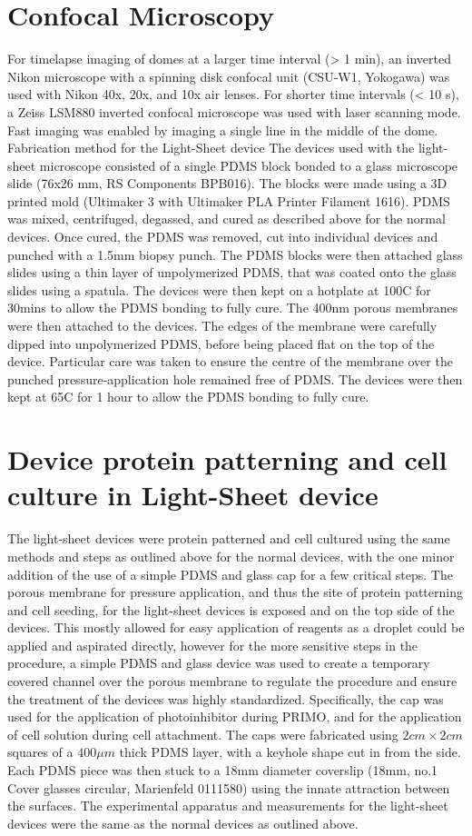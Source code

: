 \section{Confocal Microscopy}
For timelapse imaging of domes at a larger time interval (> 1 min), an inverted Nikon microscope with a spinning disk confocal unit (CSU-W1, Yokogawa) was used with Nikon 40x, 20x, and 10x air lenses. For shorter time intervals (< 10 s), a Zeiss LSM880 inverted confocal microscope was used with laser scanning mode. Fast imaging was enabled by imaging a single line in the middle of the dome.
Fabrication method for the Light-Sheet device
The devices used with the light-sheet microscope consisted of a single PDMS block bonded to a glass microscope slide (76x26 mm, RS Components BPB016). The blocks were made using a 3D printed mold (Ultimaker 3 with Ultimaker PLA Printer Filament 1616). PDMS was mixed, centrifuged, degassed, and cured as described above for the normal devices. Once cured, the PDMS was removed, cut into individual devices and punched with a 1.5mm biopsy punch.
The PDMS blocks were then attached glass slides using a thin layer of unpolymerized PDMS, that was coated onto the glass slides using a spatula. The devices were then kept on a hotplate at 100C for 30mins to allow the PDMS bonding to fully cure. 
The 400nm porous membranes were then attached to the devices. The edges of the membrane were carefully dipped into unpolymerized PDMS, before being placed flat on the top of the device. Particular care was taken to ensure the centre of the membrane over the punched pressure-application hole remained free of PDMS. The devices were then kept at 65C for 1 hour to allow the PDMS bonding to fully cure.

\section{Device protein patterning and cell culture in Light-Sheet device}
The light-sheet devices were protein patterned and cell cultured using the same methods and steps as outlined above for the normal devices, with the one minor addition of the use of a simple PDMS and glass cap for a few critical steps.
The porous membrane for pressure application, and thus the site of protein patterning and cell seeding, for the light-sheet devices is exposed and on the top side of the devices. This mostly allowed for easy application of reagents as a droplet could be applied and aspirated directly, however for the more sensitive steps in the procedure, a simple PDMS and glass device was used to create a temporary covered channel over the porous membrane to regulate the procedure and ensure the treatment of the devices was highly standardized. Specifically, the cap was used for the application of photoinhibitor during PRIMO, and for the application of cell solution during cell attachment.
The caps were fabricated using $2cm \times 2cm$ squares of a $400\mu m$ thick PDMS layer, with a keyhole shape cut in from the side. Each PDMS piece was then stuck to a 18mm diameter coverslip (18mm, no.1 Cover glasses circular, Marienfeld 0111580) using the innate attraction between the surfaces. 
The experimental apparatus and measurements for the light-sheet devices were the same as the normal devices as outlined above.

